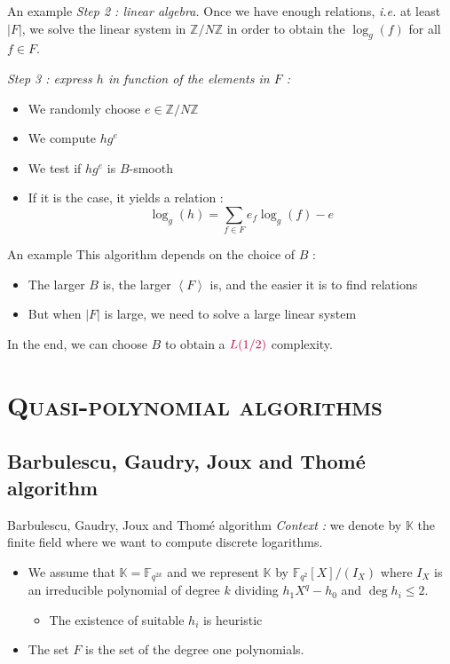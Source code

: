 \documentclass[xcolor=x11names,compress]{beamer}
\theoremstyle{break}
\theoremstyle{sc}
\theoremstyle{definition}
\theoremstyle{remark}
\newcommand{\ie}{\emph{i.e. }}
\begin{document}
\begin{frame}{An example}
  \emph{Step 2 : linear algebra.} Once we have enough relations, \ie at least
  $|F|$, we solve the linear system in $\mathbb{Z}/N\mathbb{Z}$ in order to
  obtain the $\log_g(f)$ for all $f\in F$.
  
  \emph{Step 3 : express $h$ in function of the elements in $F$ :}
  \begin{itemize}
     \item We randomly choose $e\in \mathbb{Z}/N\mathbb{Z}$
    \item We compute $hg^e$
    \item We test if $hg^e$ is $B$-smooth
    \item If it is the case, it yields a relation  :
     \[
      \log_g(h) = \sum_{f\in F}e_f\log_g(f) - e
      \]
  \end{itemize}

\end{frame}

\begin{frame}{An example}
  This algorithm depends on the choice of $B$ :
  \begin{itemize}
    \item The larger $B$ is, the larger $\left\langle F \right\rangle$ is, and
      the easier it is to find relations
    \item But when $|F|$ is large, we need to solve a large linear system
  \end{itemize}
  In the end, we can choose $B$ to obtain a $\textcolor{purple}{L(1/2)}$ complexity.
\end{frame}

\section{\scshape Quasi-polynomial algorithms} 
\subsection{Barbulescu, Gaudry, Joux and Thomé algorithm}

\begin{frame}{Barbulescu, Gaudry, Joux and Thomé algorithm}
  \emph{Context :} we denote by $\mathbb{K}$ the finite field where we want to
  compute discrete logarithms. 
  \begin{itemize}
    \item We assume that $\mathbb{K}=\mathbb{F}_{q^{2k}}$ and we represent
      $\mathbb{K}$ by $\mathbb{F}_{q^2}[X]/(I_X)$ where $I_X$ is an irreducible
      polynomial of degree $k$ dividing $h_1X^q-h_0$ and $\deg h_i\leq 2$.
      \begin{itemize}
        \item The existence of suitable $h_i$ is heuristic
      \end{itemize}
    \item The set $F$ is the set of the degree one polynomials.
\end{itemize}
\end{frame}
\end{document}
